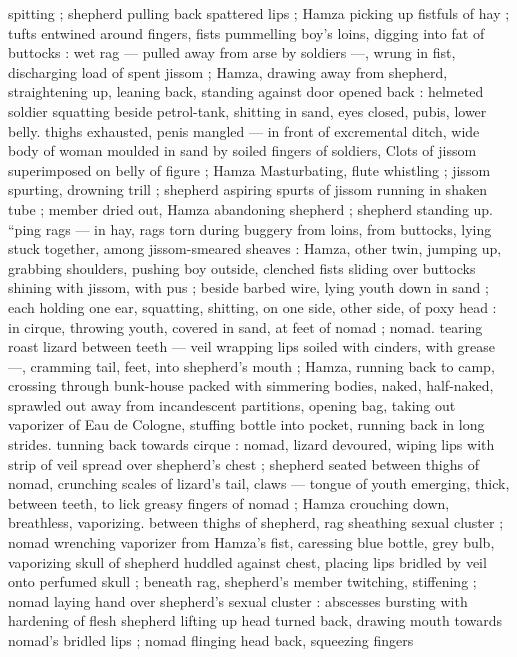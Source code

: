 spitting ; shepherd pulling back spattered lips ; Hamza picking up 
fistfuls of hay ; tufts entwined around fingers, fists pummelling boy's 
loins, digging into fat of buttocks : wet rag --- pulled away from arse 
by soldiers ---, wrung in fist, discharging load of spent jissom ; 
Hamza, drawing away from shepherd, straightening up, leaning back, 
standing against door opened back : helmeted soldier squatting 
beside petrol-tank, shitting in sand, eyes closed, pubis, lower belly. 
thighs exhausted, penis mangled --- in front of excremental ditch, 
wide body of woman moulded in sand by soiled fingers of soldiers, 
Clots of jissom superimposed on belly of figure ; Hamza 
Masturbating, flute whistling ; jissom spurting, drowning trill ; 
shepherd aspiring spurts of jissom running in shaken tube ; member 
dried out, Hamza abandoning shepherd ; shepherd standing up. 
“ping rags --- in hay, rags torn during buggery from loins, from 
buttocks, lying stuck together, among jissom-smeared sheaves : 
Hamza, other twin, jumping up, grabbing shoulders, pushing boy 
outside, clenched fists sliding over buttocks shining with jissom, with 
pus ; beside barbed wire, lying youth down in sand ; each holding 
one ear, squatting, shitting, on one side, other side, of poxy head : 
in cirque, throwing youth, covered in sand, at feet of nomad ; nomad. 
tearing roast lizard between teeth --- veil wrapping lips soiled with 
cinders, with grease ---, cramming tail, feet, into shepherd's mouth 
; Hamza, running back to camp, crossing through bunk-house packed 
with simmering bodies, naked, half-naked, sprawled out away from 
incandescent partitions, opening bag, taking out vaporizer of Eau de 
Cologne, stuffing bottle into pocket, running back in long strides. 
tunning back towards cirque : nomad, lizard devoured, wiping lips 
with strip of veil spread over shepherd's chest ; shepherd seated 
between thighs of nomad, crunching scales of lizard's tail, claws --- 
tongue of youth emerging, thick, between teeth, to lick greasy 
fingers of nomad ; Hamza crouching down, breathless, vaporizing. 
between thighs of shepherd, rag sheathing sexual cluster ; nomad 
wrenching vaporizer from Hamza's fist, caressing blue bottle, grey 
bulb, vaporizing skull of shepherd huddled against chest, placing 
lips bridled by veil onto perfumed skull ; beneath rag, shepherd's 
member twitching, stiffening ; nomad laying hand over shepherd's 
sexual cluster : abscesses bursting with hardening of flesh 
shepherd lifting up head turned back, drawing mouth towards 
nomad's bridled lips ; nomad flinging head back, squeezing fingers 
